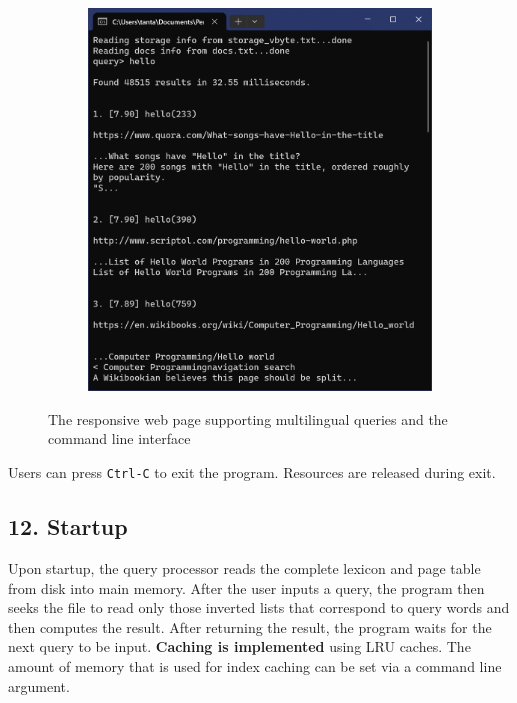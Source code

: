 \documentclass[12pt]{article}
\begin{document}
\begin{figure}[!h]
\begin{subfigure}{0.877\textwidth}
    \includegraphics{readme.assets/image-20231112215534145.png}
    \caption{}
    \label{cli}
  \end{subfigure}
  \caption{The responsive web page supporting multilingual queries and the command line interface}
  \label{interfaces}
\end{figure}

Users can press \texttt{Ctrl-C} to exit the program. Resources are
released during exit.

\hypertarget{12-startup}{%
\subsection{12. Startup}\label{12-startup}}

Upon startup, the query processor reads the complete lexicon and page
table from disk into main memory. After the user inputs a query, the
program then seeks the file to read only those inverted lists that
correspond to query words and then computes the result. After returning
the result, the program waits for the next query to be input.
\textbf{Caching is implemented} using LRU caches. The amount of memory
that is used for index caching can be set via a command line argument.
\end{document}
